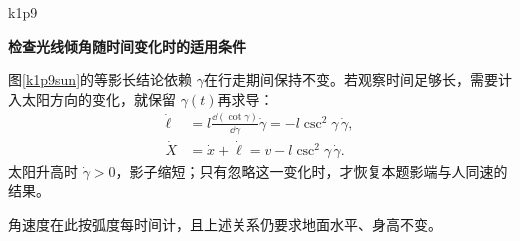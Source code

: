 \begin{drillsolution}{k1p9}
\par\medskip{}\noindent\textbf{检查光线倾角随时间变化时的适用条件}\par\nobreak
图\ref{k1p9sun}的等影长结论依赖 $\gamma$在行走期间保持不变。若观察时间足够长，需要计入太阳方向的变化，就保留 $\gamma(t)$再求导：
\begin{align*}
\dot\ell&=l\frac{\dd(\cot\gamma)}{\dd\gamma}\dot\gamma
=-l\csc^2\gamma\,\dot\gamma,\\
\dot X&=\dot x+\dot\ell=v-l\csc^2\gamma\,\dot\gamma.
\end{align*}
太阳升高时 $\dot\gamma>0$，影子缩短；只有忽略这一变化时，才恢复本题影端与人同速的结果。

角速度在此按弧度每时间计，且上述关系仍要求地面水平、身高不变。
\end{drillsolution}

